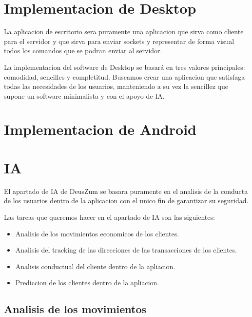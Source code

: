 \documentclass{article}
\theoremstyle{definition}
\begin{document}
\section{Implementacion de Desktop}

La aplicacion de escritorio sera puramente una aplicacion que sirva como cliente para el servidor y que sirva para enviar sockets y representar de forma visual todos los comandos que se podran enviar al servidor.

La implementacion del software de Desktop se basará en tres valores principales: comodidad, sencilles y completitud. Buscamos crear una aplicacion que satisfaga todas las necesidades de los usuarios, manteniendo a su vez la sencillez que supone un software minimalista y con el apoyo de IA.




\section{Implementacion de Android}




\section{IA}

El apartado de IA de DeusZum se basara puramente en el analisis de la conducta de los usuarios dentro de la aplicacion con el unico fin de garantizar su seguridad.

Las tareas que queremos hacer en el apartado de IA son las siguientes:

\begin{itemize}
    \item Analisis de los movimientos economicos de los clientes.
    \item Analisis del tracking de las direcciones de las transacciones de los clientes.
    \item Analisis conductual del cliente dentro de la apliacion.
    \item Prediccion de los clientes dentro de la apliacion.
\end{itemize}


\subsection{Analisis de los movimientos}

\subsection{}
\end{document}
